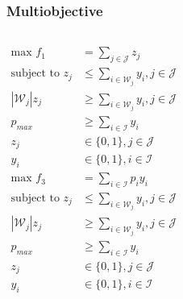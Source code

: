 \documentclass[10pt, compress]{beamer}
\begin{document}
\begin{frame}[fragile]
\frametitle{Multiobjective}
\begin{columns}[onlytextwidth]
\begin{align*}
\textrm{max } f_1 &= \sum_{j \in \mathcal{J}} z_j \\
\textrm{subject to } z_j &\leq \sum_{i \in \mathcal{W}_j} y_i, j \in \mathcal{J}\\
\left|\mathcal{W}_j\right|z_j &\geq \sum_{i \in \mathcal{W}_j} y_i, j \in \mathcal{J} \\
p_{max} &\geq \sum_{i \in \mathcal{I}} y_i  \\
z_j &\in \{0,1\}, j \in \mathcal{J} \\
y_i &\in \{0,1\}, i \in \mathcal{I}
\end{align*}
\begin{align*}
\textrm{max } f_3 &= \sum_{i \in \mathcal{I}} p_iy_i \\
\textrm{subject to } z_j &\leq \sum_{i \in \mathcal{W}_j} y_i, j \in \mathcal{J}\\
\left|\mathcal{W}_j\right|z_j &\geq \sum_{i \in \mathcal{W}_j} y_i, j \in \mathcal{J} \\
p_{max} &\geq \sum_{i \in \mathcal{I}} y_i  \\
z_j &\in \{0,1\}, j \in \mathcal{J} \\
y_i &\in \{0,1\}, i \in \mathcal{I}
\end{align*}
\end{columns}
\end{frame}
\end{document}

